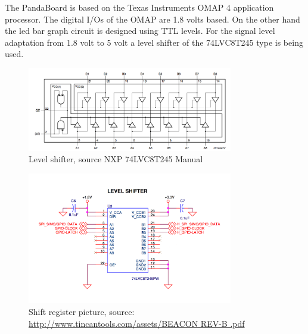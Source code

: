 The PandaBoard is based on the Texas Instruments OMAP 4 application processor. The digital I/Os of the OMAP are 1.8 volts based. On the other hand the led bar graph circuit is designed using TTL levels.   
For the signal level adaptation from 1.8 volt to 5 volt a level shifter of the  74LVC8T245 type is being used. 

\begin{figure}[H]
   \centering
   \includegraphics[width=0.8\textwidth]{img/level_Shifter.png}%
   \caption{Level shifter, source NXP  74LVC8T245 Manual}
   \label{fig:level_Shifter}%
\end{figure}

\begin{figure}[H]
   \centering
   \includegraphics[width=0.8\textwidth]{img/Levelshifter.png}%
   \caption{Shift register picture, source: \url{http://www.tincantools.com/assets/BEACON REV-B .pdf}}
   \label{fig:levelShifter2}%
\end{figure}